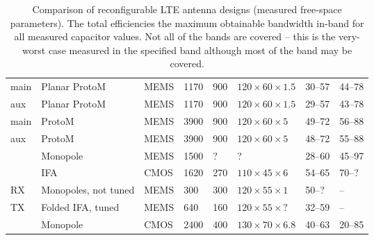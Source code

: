 \begin{table}[htbp]
\begin{tabularx}{\linewidth}{p{31mm}Xk{13mm}k{17mm}k{13mm}k{20mm}k{17mm}k{17mm}}
        \midrule
        \cite{ilvonen2014multiband} main     & Planar ProtoM               & MEMS     & 1170   & 900   & $120\times60\times1.5$   & 30--57 & 44–78         \\
        \cite{ilvonen2014multiband} aux      & Planar ProtoM               & MEMS     & 1170   & 900   & $120\times60\times1.5$   & 29--57 & 43--78        \\
        \cite{ilvonen2014multiband} main     & ProtoM                      & MEMS     & 3900   & 900   & $120\times60\times5$     & 49--72 & 56--88        \\
        \cite{ilvonen2014multiband} aux      & ProtoM                      & MEMS     & 3900   & 900   & $120\times60\times5$     & 48--72 & 55--88        \\
        \cite{morris2014tunable}             & Monopole                    & MEMS     & 1500   & ?     & ?                        & 28--60 & 45--97        \\
        \cite{xia2015compact}                & IFA                         & CMOS     & 1620   & 270   & $110\times45\times6$     & 54--65 & 70--?         \\
        \cite{tatomirescu2015alternative} RX & Monopoles, not tuned        & MEMS     & 300    & 300   & $120\times55\times1$     & 50--?  & --            \\
        \cite{tatomirescu2015alternative} TX & Folded IFA, tuned           & MEMS     & 640    & 160   & $120\times55\times?$     & 32--59 & --            \\
        \cite{trinh2016reconfigurable}       & Monopole                    & CMOS     & 2400   & 400   & $130\times70\times6.8$   & 40--63 & 20--85        \\
        \bottomrule
    \end{tabularx}
    \caption{Comparison of reconfigurable LTE antenna designs (measured free-space parameters). The total efficiencies the maximum obtainable bandwidth in-band for all measured capacitor values. \MARK{}Not all of the bands are covered -- this is the very-worst case measured in the specified band although most of the band may be covered.}
    \label{tab:comparison_reconf_lte}
\end{table}

% 
% 
% 

